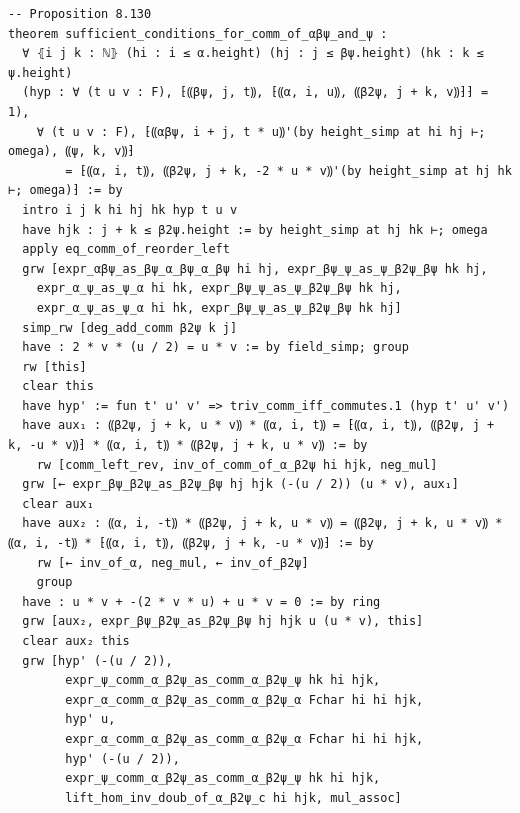 \begin{Verbatim}
-- Proposition 8.130
theorem sufficient_conditions_for_comm_of_αβψ_and_ψ :
  ∀ ⦃i j k : ℕ⦄ (hi : i ≤ α.height) (hj : j ≤ βψ.height) (hk : k ≤ ψ.height)
  (hyp : ∀ (t u v : F), ⁅⸨βψ, j, t⸩, ⁅⸨α, i, u⸩, ⸨β2ψ, j + k, v⸩⁆⁆ = 1),
    ∀ (t u v : F), ⁅⸨αβψ, i + j, t * u⸩'(by height_simp at hi hj ⊢; omega), ⸨ψ, k, v⸩⁆
        = ⁅⸨α, i, t⸩, ⸨β2ψ, j + k, -2 * u * v⸩'(by height_simp at hj hk ⊢; omega)⁆ := by
  intro i j k hi hj hk hyp t u v
  have hjk : j + k ≤ β2ψ.height := by height_simp at hj hk ⊢; omega
  apply eq_comm_of_reorder_left
  grw [expr_αβψ_as_βψ_α_βψ_α_βψ hi hj, expr_βψ_ψ_as_ψ_β2ψ_βψ hk hj,
    expr_α_ψ_as_ψ_α hi hk, expr_βψ_ψ_as_ψ_β2ψ_βψ hk hj,
    expr_α_ψ_as_ψ_α hi hk, expr_βψ_ψ_as_ψ_β2ψ_βψ hk hj]
  simp_rw [deg_add_comm β2ψ k j]
  have : 2 * v * (u / 2) = u * v := by field_simp; group
  rw [this]
  clear this
  have hyp' := fun t' u' v' => triv_comm_iff_commutes.1 (hyp t' u' v')
  have aux₁ : ⸨β2ψ, j + k, u * v⸩ * ⸨α, i, t⸩ = ⁅⸨α, i, t⸩, ⸨β2ψ, j + k, -u * v⸩⁆ * ⸨α, i, t⸩ * ⸨β2ψ, j + k, u * v⸩ := by
    rw [comm_left_rev, inv_of_comm_of_α_β2ψ hi hjk, neg_mul]
  grw [← expr_βψ_β2ψ_as_β2ψ_βψ hj hjk (-(u / 2)) (u * v), aux₁]
  clear aux₁
  have aux₂ : ⸨α, i, -t⸩ * ⸨β2ψ, j + k, u * v⸩ = ⸨β2ψ, j + k, u * v⸩ * ⸨α, i, -t⸩ * ⁅⸨α, i, t⸩, ⸨β2ψ, j + k, -u * v⸩⁆ := by
    rw [← inv_of_α, neg_mul, ← inv_of_β2ψ]
    group
  have : u * v + -(2 * v * u) + u * v = 0 := by ring
  grw [aux₂, expr_βψ_β2ψ_as_β2ψ_βψ hj hjk u (u * v), this]
  clear aux₂ this
  grw [hyp' (-(u / 2)),
        expr_ψ_comm_α_β2ψ_as_comm_α_β2ψ_ψ hk hi hjk,
        expr_α_comm_α_β2ψ_as_comm_α_β2ψ_α Fchar hi hi hjk,
        hyp' u,
        expr_α_comm_α_β2ψ_as_comm_α_β2ψ_α Fchar hi hi hjk,
        hyp' (-(u / 2)),
        expr_ψ_comm_α_β2ψ_as_comm_α_β2ψ_ψ hk hi hjk,
        lift_hom_inv_doub_of_α_β2ψ_c hi hjk, mul_assoc]
\end{Verbatim}
